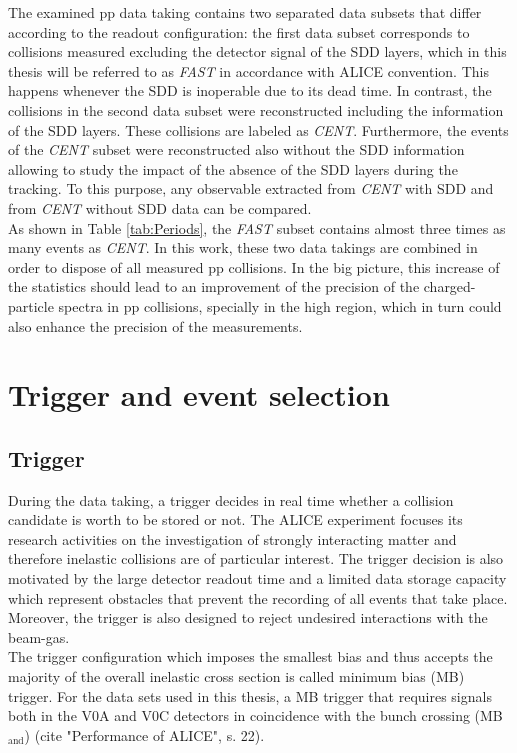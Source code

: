 \documentclass[12pt,a4paper]{report}
\begin{document}
The examined pp data taking contains two separated data subsets that differ according to the readout configuration: the first data subset corresponds to collisions measured excluding the detector signal of the SDD layers, which in this thesis will be referred to as \textit{FAST} in accordance with ALICE convention. This happens whenever the SDD is inoperable due to its dead time. In contrast, the collisions in the second data subset were reconstructed including the information of the SDD layers. These collisions are labeled as \textit{CENT}. Furthermore, the events of the \textit{CENT} subset were reconstructed also without the SDD information allowing to study the impact of the absence of the SDD layers during the tracking. To this purpose, any observable extracted from \textit{CENT} with SDD and from \textit{CENT} without SDD data can be compared. \\
As shown in Table \ref{tab:Periods}, the \textit{FAST} subset contains almost three times as many events as \textit{CENT}. In this work, these two data takings are combined in order to dispose of all measured pp collisions.  In the big picture, this increase of the statistics should lead to an improvement of the precision of the charged-particle \pt spectra in pp collisions, specially in the high \pt region, which in turn could also enhance the precision of the \raa measurements. 
\section{Trigger and event selection}
\subsection{Trigger}
During the data taking, a trigger decides in real time whether a collision candidate is worth to be stored or not. The ALICE experiment focuses its research activities on the investigation of strongly interacting matter and therefore inelastic collisions are of particular interest. The trigger decision is also motivated by the large detector readout time and a limited data storage capacity which represent obstacles that prevent the recording of all events that take place. Moreover, the trigger is also designed to reject undesired interactions with the beam-gas. \\
The trigger configuration which imposes the smallest bias and thus accepts the majority of the overall inelastic cross section is called minimum bias (MB) trigger. For the data sets used in this thesis, a MB trigger that requires signals both in the V0A and V0C detectors in coincidence with the bunch crossing (MB$_\text{and}$) (cite "Performance of ALICE", s. 22).
\end{document}

